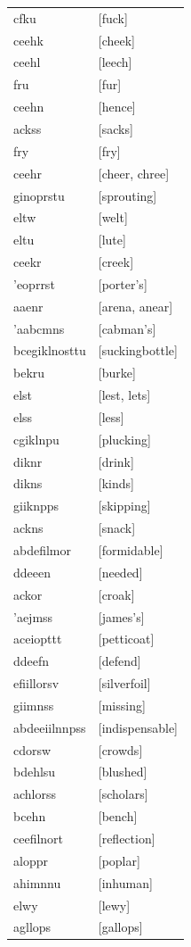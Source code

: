 \documentclass{article}
\begin{document}
\begin{tabular}{ll}
cfku & [fuck] \\
ceehk & [cheek] \\
ceehl & [leech] \\
fru & [fur] \\
ceehn & [hence] \\
ackss & [sacks] \\
fry & [fry] \\
ceehr & [cheer, chree] \\
ginoprstu & [sprouting] \\
eltw & [welt] \\
eltu & [lute] \\
ceekr & [creek] \\
'eoprrst & [porter's] \\
aaenr & [arena, anear] \\
'aabcmns & [cabman's] \\
bcegiklnosttu & [suckingbottle] \\
bekru & [burke] \\
elst & [lest, lets] \\
elss & [less] \\
cgiklnpu & [plucking] \\
diknr & [drink] \\
dikns & [kinds] \\
giiknpps & [skipping] \\
ackns & [snack] \\
abdefilmor & [formidable] \\
ddeeen & [needed] \\
ackor & [croak] \\
'aejmss & [james's] \\
aceiopttt & [petticoat] \\
ddeefn & [defend] \\
efiillorsv & [silverfoil] \\
giimnss & [missing] \\
abdeeiilnnpss & [indispensable] \\
cdorsw & [crowds] \\
bdehlsu & [blushed] \\
achlorss & [scholars] \\
bcehn & [bench] \\
ceefilnort & [reflection] \\
aloppr & [poplar] \\
ahimnnu & [inhuman] \\
elwy & [lewy] \\
agllops & [gallops] \\

\end{tabular}
\end{document}
